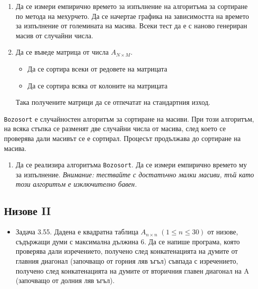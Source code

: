 \documentclass[12pt,a4paper]{article}
\newcommand{\code}[1]{\texttt{#1}}
\begin{document}
{\begin{enumerate}[resume]

  \item Да се измери емпирично времето за изпълнение на алгоритъма за сортиране по метода на мехурчето. Да се начертае графика на зависимостта на времето за изпълнение от големината на масива. Всеки тест да е с наново генериран масив от случайни числа.
  \item Да се въведе матрица от числа $A_{N \times M}$.
  \begin{itemize}
      \item Да се сортира всеки от редовете на матрицата
      \item Да се сортира всяка от колоните на матрицата
  \end{itemize}
  Така получените матрици да се отпечатат на стандартния изход.

\end{enumerate}



\begin{mdframed}[hidealllines=true,backgroundcolor=gray!20]
\code{Bozosort} е случайностен алгоритъм за сортиране на масиви. При този алгоритъм, на всяка стъпка се разменят две случайни числа от масива, след което се проверява дали масивът се е сортирал. Процесът продължава до сортиране на масива.
\end{mdframed}

\begin{enumerate}[resume]

  \item Да се реализира алгоритъма \code{Bozosort}. Да се измери емпирично времето му за изпълнение. \emph{Внимание: тествайте с достатъчно малки масиви, тъй като този алгоритъм е изключително бавен.}

\end{enumerate}

\subsection {Низове II}

\begin{itemize}[resume]

  \item Задача 3.55. \cite{sbornik} Дадена е квадратна таблица $A_{n\times n}$ $(1 \le n \le 30)$ от низове, съдържащи думи с максимална дължина 6. Да се напише програма, която проверява дали изречението, получено след конкатенацията на думите от главния диагонал (започващо от горния ляв ъгъл) съвпада с изречението, получено след конкатенацията на думите от вторичния главен диагонал на A (започващо от долния ляв ъгъл).


\end{itemize}}
\end{document}

